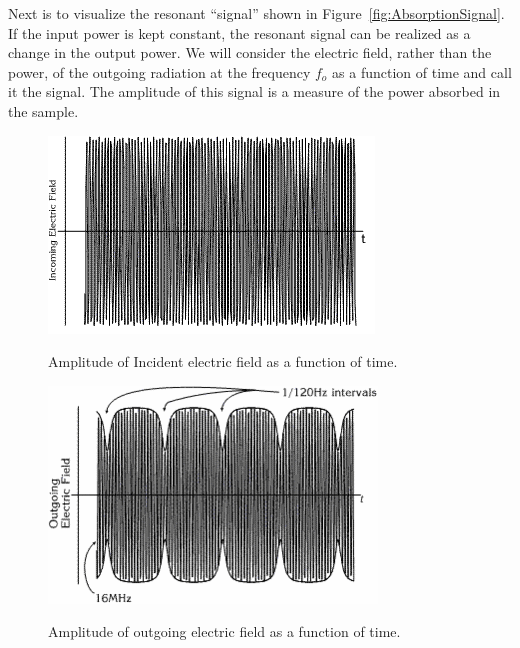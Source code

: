 \documentclass{../lab}
\begin{document}
Next is to visualize the resonant ``signal'' shown in Figure~\ref{fig:AbsorptionSignal}. If the input power is kept constant, the resonant signal can be realized as a change in the output power. We will consider the electric field, rather than the power, of the outgoing radiation at the frequency $f_o$ as a function of time and call it the signal. The amplitude of this signal is a measure of the power absorbed in the sample.

\begin{figure}[h]
\begin{minipage}[t]{0.49\textwidth}
    \href{http://experimentationlab.berkeley.edu/sites/default/files/images/NMR7.gif}{\includegraphics[width=0.9\linewidth,keepaspectratio]{images/NMR7.png}}
    \caption{Amplitude of Incident electric field as a function of time.}
    \label{fig:AmplitudeOfIncidentElectricField}
\end{minipage}\hfill
\begin{minipage}[t]{0.49\textwidth}
    \href{http://experimentationlab.berkeley.edu/sites/default/files/images/330px-NMR8.gif}{\includegraphics[width=0.9\linewidth,keepaspectratio]{images/330px-NMR8.png}}
    \caption{Amplitude of outgoing electric field as a function of time.}
    \label{fig:AmplitudeOfOutgoingElectricField}
\end{minipage}
\end{figure}
\end{document}
